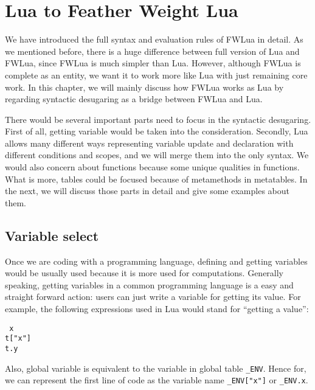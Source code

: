 \newcommand{\desugar}[2]{{#1} & \xlongequal[]{def} & {\begin{array}{@{}l@{}} #2 \end{array}}\\}
\newcommand{\desugarline}[1]{ & & {\begin{array}{@{}l@{}} #1 \end{array}}\\}

\newcommand{\translate}[2]{\llbracket {#1} \rrbracket & \xlongequal[]{} & {\begin{array}{@{}l@{}} #2 \end{array}}\\}
\newcommand{\translateline}[1]{ &  & {\begin{array}{@{}l@{}} #1 \end{array}}\\}


\chapter{Lua to Feather Weight Lua}

We have introduced the full syntax and evaluation rules of FWLua in detail. As we mentioned before, there is a huge difference between full version of Lua and FWLua, since FWLua is much simpler than Lua. However, although FWLua is complete as an entity, we want it to work more like Lua with just remaining core work. In this chapter, we will mainly discuss how FWLua works as Lua by regarding syntactic desugaring as a bridge between FWLua and Lua. 

There would be several important parts need to focus in the syntactic desugaring. First of all, getting variable would be taken into the consideration. Secondly, Lua allows many different ways representing variable update and declaration with different conditions and scopes, and we will merge them into the only syntax. We would also concern about functions because some unique qualities in functions. What is more, tables could be focused because of metamethods in metatables. In the next, we will discuss those parts in detail and give some examples about them.

\section{Variable select}
Once we are coding with a programming language, defining and getting variables would be usually used because it is more used for computations. Generally speaking, getting variables in a common programming language is a easy and straight forward action: users can just write a variable for getting its value. For example, the following expressions used in Lua would stand for ``getting a value'':
\begin{flushleft}
{\tt
x\\
t["x"]\\
t.y\\
}
\end{flushleft}
Also, global variable is equivalent to the variable in global table {\tt \_ENV}. Hence for, we can represent the first line of code as the variable name {\tt \_ENV["x"]} or {\tt \_ENV.x}.


